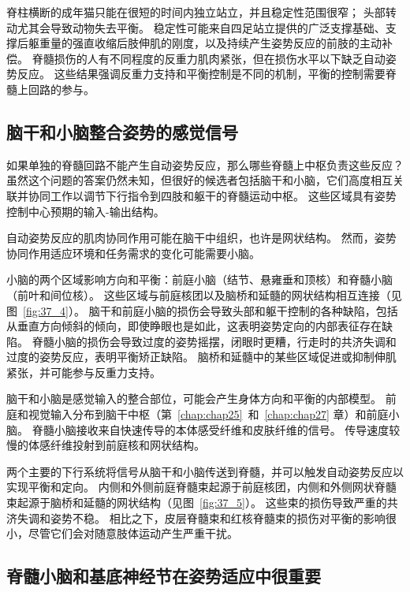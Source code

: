 脊柱横断的成年猫只能在很短的时间内独立站立，并且稳定性范围很窄；
头部转动尤其会导致动物失去平衡。
稳定性可能来自四足站立提供的广泛支撑基础、支撑后躯重量的强直收缩后肢伸肌的刚度，以及持续产生姿势反应的前肢的主动补偿。
脊髓损伤的人有不同程度的反重力肌肉紧张，但在损伤水平以下缺乏自动姿势反应。
这些结果强调反重力支持和平衡控制是不同的机制，平衡的控制需要脊髓上回路的参与。



\subsection{脑干和小脑整合姿势的感觉信号}

如果单独的脊髓回路不能产生自动姿势反应，那么哪些脊髓上中枢负责这些反应？
虽然这个问题的答案仍然未知，但很好的候选者包括脑干和小脑，它们高度相互关联并协同工作以调节下行指令到四肢和躯干的脊髓运动中枢。
这些区域具有姿势控制中心预期的输入-输出结构。


自动姿势反应的肌肉协同作用可能在脑干中组织，也许是网状结构。
然而，姿势协同作用适应环境和任务需求的变化可能需要小脑。


小脑的两个区域影响方向和平衡：前庭小脑（结节、悬雍垂和顶核）和脊髓小脑（前叶和间位核）。
这些区域与前庭核团以及脑桥和延髓的网状结构相互连接（见图~\ref{fig:37_4}）。
脑干和前庭小脑的损伤会导致头部和躯干控制的各种缺陷，包括从垂直方向倾斜的倾向，即使睁眼也是如此，这表明姿势定向的内部表征存在缺陷。
脊髓小脑的损伤会导致过度的姿势摇摆，闭眼时更糟，行走时的共济失调和过度的姿势反应，表明平衡矫正缺陷。
脑桥和延髓中的某些区域促进或抑制伸肌紧张，并可能参与反重力支持。


脑干和小脑是感觉输入的整合部位，可能会产生身体方向和平衡的内部模型。
前庭和视觉输入分布到脑干中枢（第~\ref{chap:chap25}~和~\ref{chap:chap27} 章）和前庭小脑。
脊髓小脑接收来自快速传导的本体感受纤维和皮肤纤维的信号。
传导速度较慢的体感纤维投射到前庭核和网状结构。


两个主要的下行系统将信号从脑干和小脑传送到脊髓，并可以触发自动姿势反应以实现平衡和定向。
内侧和外侧前庭脊髓束起源于前庭核团，内侧和外侧网状脊髓束起源于脑桥和延髓的网状结构（见图~\ref{fig:37_5}）。
这些束的损伤导致严重的共济失调和姿势不稳。
相比之下，皮层脊髓束和红核脊髓束的损伤对平衡的影响很小，尽管它们会对随意肢体运动产生严重干扰。



\subsection{脊髓小脑和基底神经节在姿势适应中很重要}

